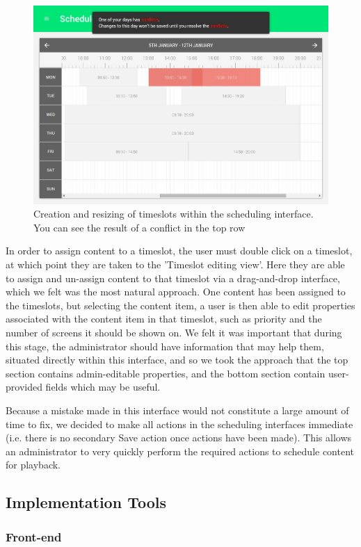 \documentclass[a4paper, titlepage]{article}
\begin{document}
\begin{figure}[h!]
  \centering
  \includegraphics[width=.6\textwidth]{./design/schedule.jpg}
  \caption{Creation and resizing of timeslots within the scheduling interface. You can see the result of a conflict in the top row}
  \label{fig:schedule_screenshot}
\end{figure}

In order to assign content to a timeslot, the user must double click on a timeslot, at which point they are taken to the 'Timeslot editing view'. Here they are able to assign and un-assign content to that timeslot via a drag-and-drop interface, which we felt was the most natural approach. One content has been assigned to the timeslots, but selecting the content item, a user is then able to edit properties associated with the content item in that timeslot, such as priority and the number of screens it should be shown on. We felt it was important that during this stage, the administrator should have information that may help them, situated directly within this interface, and so we took the approach that the top section contains admin-editable properties, and the bottom section contain user-provided fields which may be useful.

Because a mistake made in this interface would not constitute a large amount of time to fix, we decided to make all actions in the scheduling interfaces immediate (i.e. there is no secondary Save action once actions have been made). This allows an administrator to very quickly perform the required actions to schedule content for playback.


\subsection{Implementation Tools}

\subsubsection{Front-end}
\end{document}
